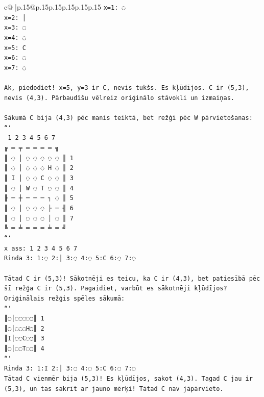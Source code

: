 \documentclass{article}
\begin{document}
{\begin{supertabular}{c@{$\;$}|p{.15\linewidth}@{}p{.15\linewidth}p{.15\linewidth}p{.15\linewidth}p{.15\linewidth}p{.15\linewidth}}
{{{\texttt{x=1: ◌} \\
\texttt{x=2: │} \\
\texttt{x=3: ◌} \\
\texttt{x=4: ◌} \\
\texttt{x=5: C} \\
\texttt{x=6: ◌} \\
\texttt{x=7: ◌} \\
\\ 
\texttt{Ak, piedodiet! x=5, y=3 ir C, nevis tukšs. Es kļūdījos. C ir (5,3), nevis (4,3). Pārbaudīšu vēlreiz oriģinālo stāvokli un izmaiņas.} \\
\\ 
\texttt{Sākumā C bija (4,3) pēc manis teiktā, bet režģī pēc W pārvietošanas:} \\
\texttt{```} \\
\texttt{ 1 2 3 4 5 6 7} \\
\texttt{╔ ═ ╤ ═ ═ ═ ═ ╗} \\
\texttt{║ ◌ │ ◌ ◌ ◌ ◌ ◌ ║ 1} \\
\texttt{║ ◌ │ ◌ ◌ ◌ H ◌ ║ 2} \\
\texttt{║ I │ ◌ ◌ C ◌ ◌ ║ 3} \\
\texttt{║ ◌ │ W ◌ T ◌ ◌ ║ 4} \\
\texttt{╟ ─ ┼ ─ ─ ─ ┐ ◌ ║ 5} \\
\texttt{║ ◌ │ ◌ ◌ ◌ ├ ─ ╢ 6} \\
\texttt{║ ◌ │ ◌ ◌ ◌ │ ◌ ║ 7} \\
\texttt{╚ ═ ╧ ═ ═ ═ ╧ ═ ╝} \\
\texttt{```} \\
\texttt{x ass: 1 2 3 4 5 6 7} \\
\texttt{Rinda 3: 1:◌ 2:│ 3:◌ 4:◌ 5:C 6:◌ 7:◌} \\
\\ 
\texttt{Tātad C ir (5,3)! Sākotnēji es teicu, ka C ir (4,3), bet patiesībā pēc šī režģa C ir (5,3). Pagaidiet, varbūt es sākotnēji kļūdījos? Oriģinālais režģis spēles sākumā:} \\
\texttt{```} \\
\texttt{║◌│◌◌◌◌◌║ 1} \\
\texttt{║◌│◌◌◌H◌║ 2} \\
\texttt{║I│◌◌C◌◌║ 3} \\
\texttt{║◌│◌◌T◌◌║ 4} \\
\texttt{```} \\
\texttt{Rinda 3: 1:I 2:│ 3:◌ 4:◌ 5:C 6:◌ 7:◌} \\
\texttt{Tātad C vienmēr bija (5,3)! Es kļūdījos, sakot (4,3). Tagad C jau ir (5,3), un tas sakrīt ar jauno mērķi! Tātad C nav jāpārvieto.} \\
}}}
\end{supertabular}}
\end{document}
